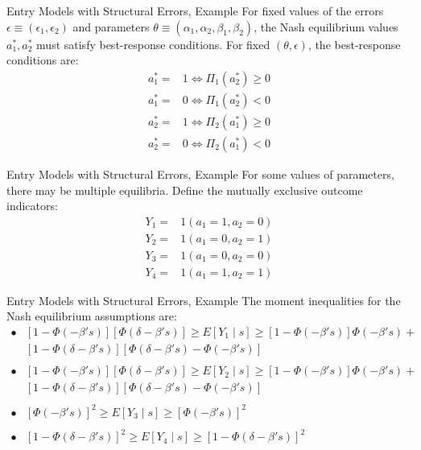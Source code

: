 \begin{frame}{Entry Models with Structural Errors, Example}
For fixed values of the errors $\epsilon \equiv (\epsilon_1, \epsilon_2)$ and parameters $\theta \equiv (\alpha_1, \alpha_2, \beta_1, \beta_2)$, the Nash equilibrium values $a^*_1, a^*_2$ must satisfy best-response conditions. For fixed $(\theta, \epsilon)$, the best-response conditions are:
\begin{equation*}
\begin{split}
a^*_1 = & 1 \Leftrightarrow \Pi_1 (a^*_2) \geq 0 \\
a^*_1 = & 0 \Leftrightarrow \Pi_1 (a^*_2) < 0 \\
a^*_2 = & 1 \Leftrightarrow \Pi_2 (a^*_1) \geq 0 \\
a^*_2 = & 0 \Leftrightarrow \Pi_2 (a^*_1) < 0
\end{split}
\end{equation*}
\end{frame}

\begin{frame}{Entry Models with Structural Errors, Example}
For some values of parameters, there may be multiple equilibria. Define the mutually exclusive outcome indicators:
\begin{equation*}
\begin{split}
Y_1 = & 1 (a_1 = 1, a_2 = 0) \\
Y_2 = & 1 (a_1 = 0, a_2 = 1) \\
Y_3 = & 1 (a_1 = 0, a_2 = 0) \\
Y_4 = & 1 (a_1 = 1, a_2 = 1) 
\end{split}
\end{equation*}
\end{frame}

\begin{frame}{Entry Models with Structural Errors, Example}
The moment inequalities for the Nash equilibrium assumptions are:
\begin{equation*}
\begin{split}
\bullet & [1- \Phi(-\beta 's)][\Phi(\delta - \beta 's)] \geq E[Y_1 \mid s] \geq [1 -\Phi(-\beta 's)] \Phi(-\beta 's) + \\ 
& [1 - \Phi(\delta - \beta 's)][\Phi(\delta - \beta 's) - \Phi(-\beta 's)] \\ \\
\bullet & [1- \Phi(-\beta 's)][\Phi(\delta - \beta 's)] \geq E[Y_2 \mid s] \geq [1 -\Phi(-\beta 's)] \Phi(-\beta 's) + \\ 
& [1 - \Phi(\delta - \beta 's)][\Phi(\delta - \beta 's) - \Phi(-\beta 's)] \\ \\
\bullet & [\Phi(-\beta 's)]^2 \geq E[Y_3 \mid s] \geq [\Phi (-\beta 's)]^2 \\ \\
\bullet & [1 - \Phi (\delta - \beta 's)]^2 \geq E[Y_4 \mid s] \geq [1 - \Phi (\delta - \beta 's)]^2
\end{split}
\end{equation*}
\end{frame}


